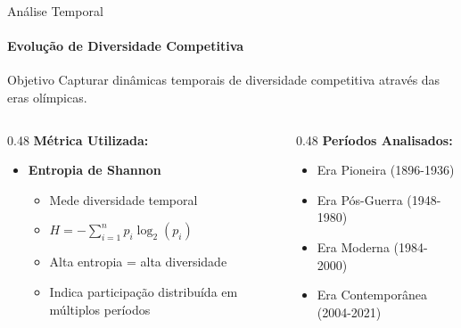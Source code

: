 \begin{frame}{Análise Temporal}
    \framesubtitle{Evolução de Diversidade Competitiva}
    \begin{block}{Objetivo}
        Capturar dinâmicas temporais de diversidade competitiva através das eras olímpicas.
    \end{block}

    \begin{columns}[T]
        \begin{column}{0.48\textwidth}
            \textbf{Métrica Utilizada:}
            \begin{itemize}
                \item \textbf{Entropia de Shannon}
                \begin{itemize}
                    \footnotesize
                    \item Mede diversidade temporal
                    \item $H = -\sum_{i=1}^{n} p_i \log_2(p_i)$
                    \item Alta entropia = alta diversidade
                    \item Indica participação distribuída em múltiplos períodos
                \end{itemize}
            \end{itemize}
        \end{column}
        \begin{column}{0.48\textwidth}
            \textbf{Períodos Analisados:}
            \begin{itemize}
                \item Era Pioneira (1896-1936)
                \item Era Pós-Guerra (1948-1980)
                \item Era Moderna (1984-2000)
                \item Era Contemporânea (2004-2021)
            \end{itemize}
        \end{column}
    \end{columns}
\end{frame}

